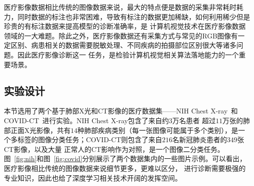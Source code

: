 医疗影像数据相比传统的图像数据来说，最大的特点便是数据的采集非常耗时耗力，同时数据的标注也非常困难，导致有标注的数据更加稀缺，如何利用稀少但是珍贵的有标注数据来提高模型的诊断准确率，是
计算机视觉技术在医疗影像数据领域的一大难题。除此之外，医疗影像数据还有采集方式与常见的RGB图像有一定区别、病患相关的数据需要脱敏处理、不同疾病的拍摄部位区别很大等诸多问题。因此医疗影像诊断这一
任务，是检验计算机视觉相关算法落地能力的一个重要场景。

\subsection{实验设计}

本节选用了两个基于肺部X光和CT影像的医疗数据集——NIH Chest X-ray~\citep{wang2017chestxray}和COVID-CT~\citep{he2020sample}进行实验。NIH Chest X-ray包含了来自约$3$万名患者
超过$11$万张的肺部正面X光影像，共有$14$种肺部疾病类别（每一张图像可能属于多个类别），是一个多标签的图像分类任务；COVID-CT则包含了来自$216$名新冠肺炎患者的$349$张CT影像，以及大量
正常人的CT影响作为对照，是一个图像二分类任务。图~\ref{fig:nih}和图~\ref{fig:covid}分别展示了两个数据集内的一些图片示例。可以看出，医疗影像相比传统的图像数据来说细节更多，更难以区分，
进行诊断需要极强的专业知识，因此也给了深度学习相关技术开阔的发挥空间。



